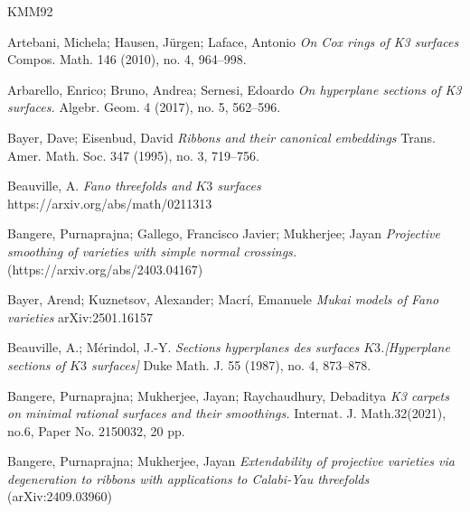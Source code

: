 \documentclass[11pt,twoside]{amsart}
\theoremstyle{plain}
\numberwithin{equation}{section}
\theoremstyle{definition}
\begin{document}










\vspace{0.5cm}


\begin{thebibliography}{KMM92}
\color{black}



Artebani, Michela; Hausen, Jürgen; Laface, Antonio
\emph{On Cox rings of K3 surfaces}
Compos. Math. 146 (2010), no. 4, 964–998.

Arbarello, Enrico; Bruno, Andrea; Sernesi, Edoardo
\emph{On hyperplane sections of K3 surfaces.}
Algebr. Geom. 4 (2017), no. 5, 562–596.

Bayer, Dave; Eisenbud, David
\emph{Ribbons and their canonical embeddings}
Trans. Amer. Math. Soc. 347 (1995), no. 3, 719–756.


Beauville, A. \emph{Fano threefolds and $K3$ surfaces}
https://arxiv.org/abs/math/0211313

 Bangere, Purnaprajna; Gallego, Francisco Javier; Mukherjee; Jayan \emph{Projective smoothing of varieties with simple normal crossings.}(https://arxiv.org/abs/2403.04167)

Bayer, Arend;  Kuznetsov, Alexander;  Macr\'i, Emanuele 
\emph{Mukai models of Fano varieties}
arXiv:2501.16157

Beauville, A.; Mérindol, J.-Y.
\emph{Sections hyperplanes des surfaces $K3$.[Hyperplane sections of $K3$ surfaces]}
Duke Math. J. 55 (1987), no. 4, 873–878.

Bangere, Purnaprajna; Mukherjee, Jayan; Raychaudhury, Debaditya
\emph{K3 carpets on minimal rational surfaces and their smoothings.}
Internat. J. Math.32(2021), no.6, Paper No. 2150032, 20 pp.

Bangere, Purnaprajna; Mukherjee, Jayan  
\emph{Extendability of projective varieties via degeneration to ribbons with applications to Calabi-Yau threefolds} (arXiv:2409.03960)


\end{thebibliography}
\end{document}
